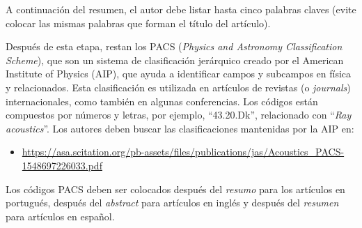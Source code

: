 \documentclass[12pt, a4paper, twoside, twocolumn]{article}
\begin{document}
A continuación del resumen, el autor debe listar hasta cinco palabras claves (evite colocar las mismas palabras que forman el título del artículo). 

Después de esta etapa, restan los PACS (\textit{Physics and Astronomy Classification Scheme}), que son un sistema de clasificación jerárquico creado por el  American Institute of Physics (AIP), que ayuda a identificar campos y subcampos en física y relacionados. Esta clasificación es utilizada en artículos de revistas (o \textit{journals}) internacionales, como también en algunas conferencias. Los códigos están compuestos por números y letras, por ejemplo, ``43.20.Dk'', relacionado con ``\textit{Ray acoustics}''. Los autores deben buscar las clasificaciones mantenidas por la AIP en:

\begin{itemize}[noitemsep,topsep=-1ex] \itemsep=8pt
	\item \url{https://asa.scitation.org/pb-assets/files/publications/jas/Acoustics_PACS-1548697226033.pdf}
\end{itemize}
\vspace{0.25em}

Los códigos PACS deben ser colocados después del \textit{resumo} para los artículos en portugués, después del \textit{abstract} para artículos en inglés y después del \textit{resumen} para artículos en español.
\end{document}
